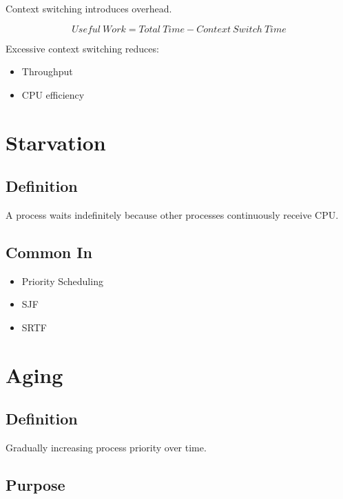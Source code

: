 Context switching introduces overhead.

\[
Useful\ Work = Total\ Time - Context\ Switch\ Time
\]

Excessive context switching reduces:

\begin{itemize}
\item Throughput
\item CPU efficiency
\end{itemize}

\section{Starvation}

\subsection{Definition}

A process waits indefinitely because other processes continuously receive CPU.

\subsection{Common In}

\begin{itemize}
\item Priority Scheduling
\item SJF
\item SRTF
\end{itemize}

\section{Aging}

\subsection{Definition}

Gradually increasing process priority over time.

\subsection{Purpose}

